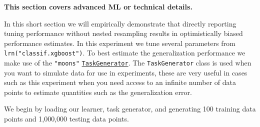\begin{tcolorbox}[enhanced jigsaw, colframe=quarto-callout-note-color-frame, rightrule=.15mm, bottomrule=.15mm, toprule=.15mm, opacityback=0, colback=white, left=2mm, arc=.35mm, breakable, leftrule=.75mm]
\begin{minipage}[t]{5.5mm}
\textcolor{quarto-callout-note-color}{\faInfo}
\end{minipage}%
\begin{minipage}[t]{\textwidth - 5.5mm}

\textbf{This section covers advanced ML or technical
details.}\vspace{2mm}

\end{minipage}%
\end{tcolorbox}

In this short section we will empirically demonstrate that directly
reporting tuning performance without nested resampling results in
optimistically biased performance estimates. In this experiment we tune
several parameters from \texttt{lrn("classif.xgboost")}. To best
estimate the generalization performance we make use of the
\texttt{"moons"}
\href{https://mlr3.mlr-org.com/reference/TaskGenerator.html}{\texttt{TaskGenerator}}.
The \texttt{TaskGenerator} class is used when you want to simulate data
for use in experiments, these are very useful in cases such as this
experiment when you need access to an infinite number of data points to
estimate quantities such as the generalization error.

We begin by loading our learner, task generator, and generating 100
training data points and 1,000,000 testing data points.

